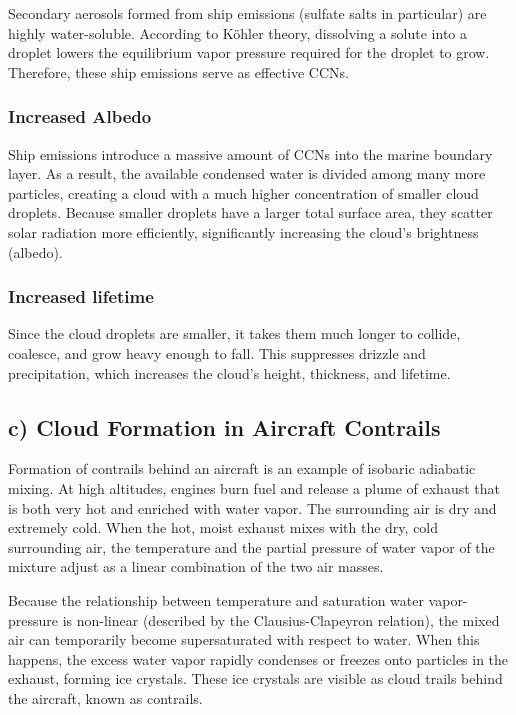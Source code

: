 \documentclass{article}
\begin{document}
Secondary aerosols formed from ship emissions (sulfate salts in particular) are highly water-soluble. According to Köhler theory, dissolving a solute into a droplet lowers the equilibrium vapor pressure required for the droplet to grow. Therefore, these ship emissions serve as effective CCNs. 

\subsubsection*{Increased Albedo}

Ship emissions introduce a massive amount of CCNs into the marine boundary layer. As a result, the available condensed water is divided among many more particles, creating a cloud with a much higher concentration of smaller cloud droplets. Because smaller droplets have a larger total surface area, they scatter solar radiation more efficiently, significantly increasing the cloud's brightness (albedo).  

\subsubsection*{Increased lifetime}

Since the cloud droplets are smaller, it takes them much longer to collide, coalesce, and grow heavy enough to fall. This suppresses drizzle and precipitation, which increases the cloud's height, thickness, and lifetime. 

\subsection*{c) Cloud Formation in Aircraft Contrails}

Formation of contrails behind an aircraft is an example of isobaric adiabatic mixing. At high altitudes, engines burn fuel and release a plume of exhaust that is both very hot and enriched with water vapor. The surrounding air is dry and extremely cold. When the hot, moist exhaust mixes with the dry, cold surrounding air, the temperature and the partial pressure of water vapor of the mixture adjust as a linear combination of the two air masses. 

Because the relationship between temperature and saturation water vapor-pressure is non-linear (described by the Clausius-Clapeyron relation), the mixed air can temporarily become supersaturated with respect to water. When this happens, the excess water vapor rapidly condenses or freezes onto particles in the exhaust, forming ice crystals. These ice crystals are visible as cloud trails behind the aircraft, known as contrails. 
\end{document}
